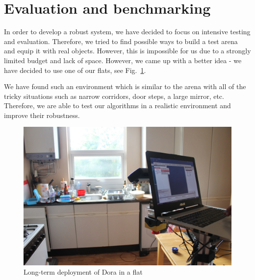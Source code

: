 \section{Evaluation and benchmarking}

In order to develop a robust system, we have decided to focus on intensive testing and evaluation. 
Therefore, we tried to find possible ways to build a test arena and equip it with real objects.
However, this is impossible for us due to a strongly limited budget and lack of space. 
However, we came up with a better idea - we have decided to use one of our flats, see Fig.~\ref{fig:kitchen}.

We have found such an environment which is similar to the arena with all of the tricky situations such as narrow corridors, door steps, a large mirror, etc. 
Therefore, we are able to test our algorithms in a realistic environment and improve their robustness.

\begin{figure}[!htb]
\centering
\includegraphics[width=3.in]{kitchen.JPG}
\caption{Long-term deployment of Dora in a flat}
\label{fig:kitchen}
\end{figure}  